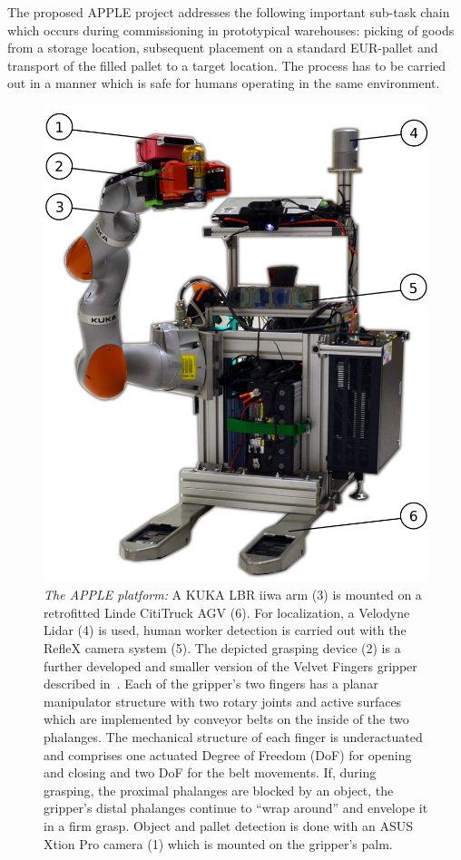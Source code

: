 The proposed APPLE project addresses the following important sub-task chain which occurs during
commissioning in prototypical warehouses: picking of goods from a storage location, subsequent
placement on a standard EUR-pallet and transport of the filled pallet to a target location. The
process has to be carried out in a manner which is safe for humans operating in the same
environment.
%
\begin{figure}[t!]
\begin{center}
\includegraphics[width =0.85\linewidth]{figs/apple_demonstrator}
\caption{\textit{The APPLE platform:} A KUKA LBR iiwa arm (3) is mounted on a retrofitted Linde
  CitiTruck AGV (6). For localization, a Velodyne Lidar (4) is used, human worker detection is
  carried out with the RefleX camera system (5). The depicted grasping device (2) is a further
  developed and smaller version of the Velvet Fingers gripper described in~\cite{Tinc12}. Each of
  the gripper’s two fingers has a planar manipulator structure with two rotary joints and active
  surfaces which are implemented by conveyor belts on the inside of the two phalanges. The
  mechanical structure of each finger is underactuated and comprises one actuated Degree of Freedom
  (DoF) for opening and closing and two DoF for the belt movements. If, during grasping, the
  proximal phalanges are blocked by an object, the gripper’s distal phalanges continue to “wrap
  around” and envelope it in a firm grasp. Object and pallet detection is done with an ASUS Xtion
  Pro camera (1) which is mounted on the gripper's palm.}
\label{fig:robot}
\vspace{-0.65cm}
\end{center}
\end{figure}

